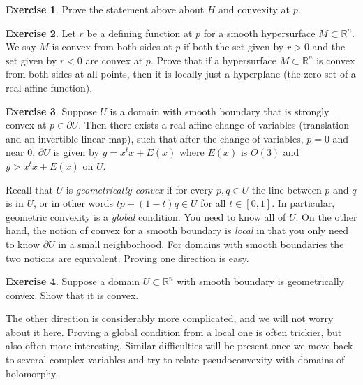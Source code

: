 \documentclass[12pt,openany]{book}
\newcommand{\R}{{\mathbb{R}}}
\newcommand{\myindex}[1]{#1\index{#1}}
\theoremstyle{plain}
\theoremstyle{remark}
\theoremstyle{definition}
\newenvironment{exbox}{%
    \def\FrameCommand{\vrule width 1pt \relax\hspace{10pt}}%
    \MakeFramed{\advance\hsize-\width\FrameRestore}%
}{%
    \endMakeFramed
}
\theoremstyle{exercise}
\newtheorem{exercise}{Exercise}[section]
\theoremstyle{example}
\begin{document}
\begin{exbox}
\begin{exercise}
Prove the statement above about $H$ and convexity at $p$.
\end{exercise}

\begin{exercise}
Let $r$ be a defining function at $p$ for a smooth hypersurface
$M \subset \R^n$.
We say $M$ is convex from both sides at $p$ if both the set given by
$r > 0$ and the set given by $r < 0$ are convex at $p$.
Prove that if a hypersurface $M \subset \R^n$ is convex from both sides at all
points, then it is locally just a hyperplane (the zero set of a real affine
function).
\end{exercise}

\begin{exercise}
Suppose $U$ is a domain with smooth boundary that is strongly convex
at $p \in \partial U$.
Then there exists a real affine change of variables (translation and an
invertible linear map), such that after the change of variables, $p=0$ and near $0$, $\partial U$ is given by
$y = x^t x + E(x)$ where $E(x)$ is $O(3)$ and
$y > x^tx + E(x)$ on $U$.
\end{exercise}
\end{exbox}

Recall that $U$ is
\emph{\myindex{geometrically convex}}
if for every $p,q \in U$ the
line between $p$ and $q$ is in $U$, or in other words
$tp +(1-t)q \in U$ for all $t \in [0,1]$.
In particular, geometric convexity is a \emph{global} condition.  You need
to know all of $U$.  On the other hand, the notion of convex for a smooth boundary is
\emph{local} in that you only need to know $\partial U$ in a small
neighborhood.  For domains with
smooth boundaries the two notions are equivalent.  Proving
one direction is easy.

\begin{exbox}
\begin{exercise}
Suppose a domain $U \subset \R^n$ with smooth
boundary is geometrically
convex.  Show that it is convex.
\end{exercise}
\end{exbox}

The other direction is considerably more complicated, and we will not worry
about it here.  Proving a global condition from a local one is often
trickier, but also often more interesting.
Similar difficulties will be present once we move back to
several complex variables and try to relate pseudoconvexity with domains of
holomorphy.
\end{document}
